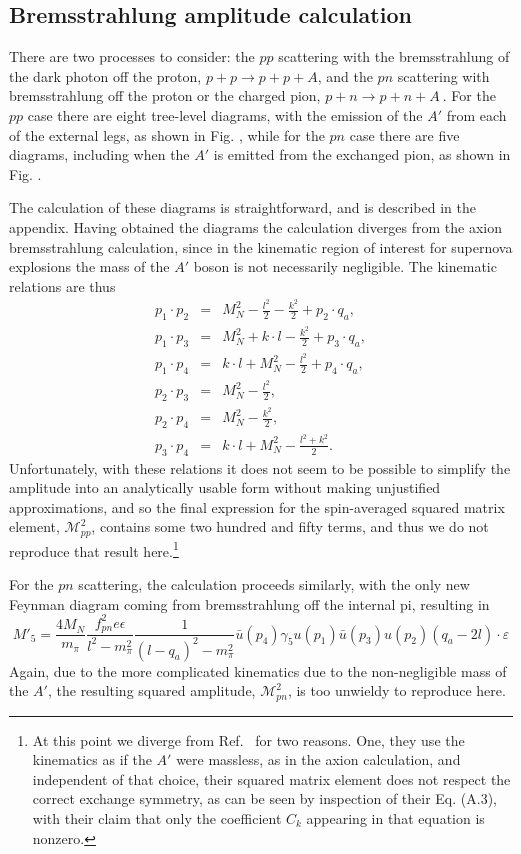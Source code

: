 \documentclass[nofootinbib,aps,prd,preprint,superscriptaddress]{revtex4}
\newcommand{\beq}{\begin{equation}}
\newcommand{\eeq}{\end{equation}}
\newcommand{\bea}{\begin{eqnarray}}
\newcommand{\eea}{\end{eqnarray}}
\begin{document}
\subsection{Bremsstrahlung amplitude calculation}
	 There are two processes to consider: the $pp$ scattering with the bremsstrahlung of the dark photon off the proton, $ p+p \rightarrow p+p+A$, and the $pn$ scattering with bremsstrahlung off the proton or the charged pion, $ p+n \rightarrow p+n+A\ $. For the $pp$ case there are eight tree-level diagrams, with the emission of the $A'$ from each of the external legs, as shown in Fig. , while for the $pn$ case there are five diagrams, including when the $A'$ is emitted from the exchanged pion, as shown in Fig. .
	
The calculation of these diagrams is straightforward, and is described in the appendix. Having obtained the diagrams the calculation diverges from the axion bremsstrahlung calculation, since in the kinematic region of interest for supernova explosions the mass of the $A'$ boson is not necessarily negligible. The kinematic relations are thus \bea 
p_1 \cdot p_2 &=& M_N^2 - \frac{l^2}{2} - \frac{k^2}{2} + p_2 \cdot q_a,\\
p_1 \cdot p_3 &=& M_N^2 + k \cdot l - \frac{k^2}{2} + p_3 \cdot q_a,\\  
p_1 \cdot p_4 &=& k \cdot l + M_N^2 - \frac{l^2}{2} + p_4 \cdot q_a, \\
p_2 \cdot p_3 &=& M_N^2 - \frac{l^2}{2}, \\ 
p_2 \cdot p_4 &=& M_N^2 - \frac{k^2}{2},\\
p_3 \cdot p_4 &=& k \cdot l + M_N^2 - \frac{l^2 + k^2}{2}.
\eea
Unfortunately, with these relations it does not seem to be possible to simplify the amplitude into an analytically usable form without making unjustified approximations, and so the final expression for the spin-averaged squared matrix element, $ \mathcal{M}^2_{pp}$, contains some two hundred and fifty terms, and thus we do not reproduce that result here.\footnote{At this point we diverge from Ref.~\cite{Dent:2012mx} for two reasons.  One, they use the kinematics as if the $A'$ were massless, as in the axion calculation, and independent of that choice, their squared matrix element does not respect the correct exchange symmetry, as can be seen by inspection of their Eq. (A.3), with their claim that only the coefficient $C_k$ appearing in that equation is nonzero.}

 
 	 
 For the $pn$ scattering, the calculation proceeds similarly, with the only new Feynman diagram coming from bremsstrahlung off the internal pi, resulting in  
 \beq
 M'_5 = \frac{4 M_N}{ m_\pi} \frac{f_{pn}^2 e \epsilon}{l^2-m_\pi^2
 	 }  \frac{1}{(l-q_a)^2 - m_\pi^2} \bar{u}(p_4) \gamma_5 u(p_1) \bar{u}(p_3) u(p_2) (q_a - 2l)\cdot \varepsilon
\eeq
Again, due to the more complicated kinematics due to the non-negligible mass of the $A'$, the resulting squared amplitude, $ \mathcal{M}^2_{pn}$, is too unwieldy to reproduce here.
\end{document}
